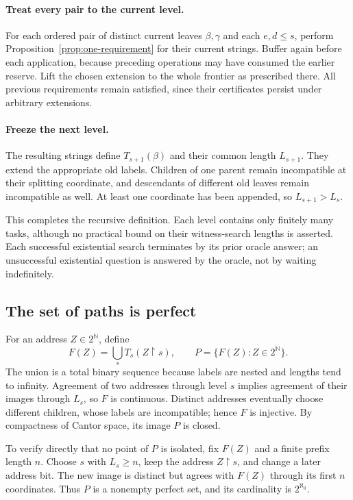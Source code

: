 \documentclass[11pt,a4paper]{article}
\newcommand{\N}{\mathbb N}
\newcommand{\Cantor}{2^{\N}}
\newcommand{\restr}{\mathbin{\upharpoonright}}
\theoremstyle{definition}\newtheorem{definition}[theorem]{Definition}
\theoremstyle{remark}\newtheorem{remark}[theorem]{Remark}
\begin{document}
\paragraph{Treat every pair to the current level.}
For each ordered pair of distinct current leaves $\beta,\gamma$ and each
$e,d\le s$, perform Proposition~\ref{prop:one-requirement} for their current
strings. Buffer again before each application, because preceding operations
may have consumed the earlier reserve. Lift the chosen extension to the
whole frontier as prescribed there. All previous requirements remain
satisfied, since their certificates persist under arbitrary extensions.

\paragraph{Freeze the next level.}
The resulting strings define $T_{s+1}(\beta)$ and their common length
$L_{s+1}$. They extend the appropriate old labels. Children of one parent
remain incompatible at their splitting coordinate, and descendants of
different old leaves remain incompatible as well. At least one coordinate
has been appended, so $L_{s+1}>L_s$.

This completes the recursive definition. Each level contains only finitely
many tasks, although no practical bound on their witness-search lengths is
asserted. Each successful existential search terminates by its prior oracle
answer; an unsuccessful existential question is answered by the oracle, not
by waiting indefinitely.

\subsection{The set of paths is perfect}
For an address $Z\in\Cantor$, define
\begin{equation}\label{eq:path-map}
                   F(Z)=\bigcup_s T_s(Z\restr s),
              \qquad P=\{F(Z):Z\in\Cantor\}.
\end{equation}
The union is a total binary sequence because labels are nested and lengths
tend to infinity. Agreement of two addresses through level $s$ implies
agreement of their images through $L_s$, so $F$ is continuous. Distinct
addresses eventually choose different children, whose labels are
incompatible; hence $F$ is injective. By compactness of Cantor space, its
image $P$ is closed.

To verify directly that no point of $P$ is isolated, fix $F(Z)$ and a finite
prefix length $n$. Choose $s$ with $L_s\ge n$, keep the address $Z\restr s$,
and change a later address bit. The new image is distinct but agrees with
$F(Z)$ through its first $n$ coordinates. Thus $P$ is a nonempty perfect set,
and its cardinality is $2^{\aleph_0}$.
\end{document}
